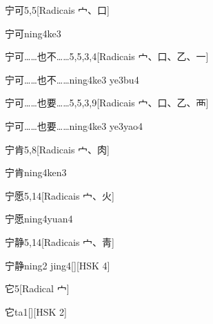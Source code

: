 \begin{entry}{宁可}{5,5}[Radicais ⼧、⼝]
  \begin{phonetics}{宁可}{ning4ke3}
  \end{phonetics}
\end{entry}

\begin{entry}{宁可……也不……}{5,5,3,4}[Radicais ⼧、⼝、⼄、⼀]
  \begin{phonetics}{宁可……也不……}{ning4ke3 ye3bu4}
  \end{phonetics}
\end{entry}

\begin{entry}{宁可……也要……}{5,5,3,9}[Radicais ⼧、⼝、⼄、⾑]
  \begin{phonetics}{宁可……也要……}{ning4ke3 ye3yao4}
  \end{phonetics}
\end{entry}

\begin{entry}{宁肯}{5,8}[Radicais ⼧、⾁]
  \begin{phonetics}{宁肯}{ning4ken3}
  \end{phonetics}
\end{entry}

\begin{entry}{宁愿}{5,14}[Radicais ⼧、⽕]
  \begin{phonetics}{宁愿}{ning4yuan4}
  \end{phonetics}
\end{entry}

\begin{entry}{宁静}{5,14}[Radicais ⼧、⾭]
  \begin{phonetics}{宁静}{ning2 jing4}[][HSK 4]
  \end{phonetics}
\end{entry}

\begin{entry}{它}{5}[Radical ⼧]
  \begin{phonetics}{它}{ta1}[][HSK 2]
  \end{phonetics}
\end{entry}

